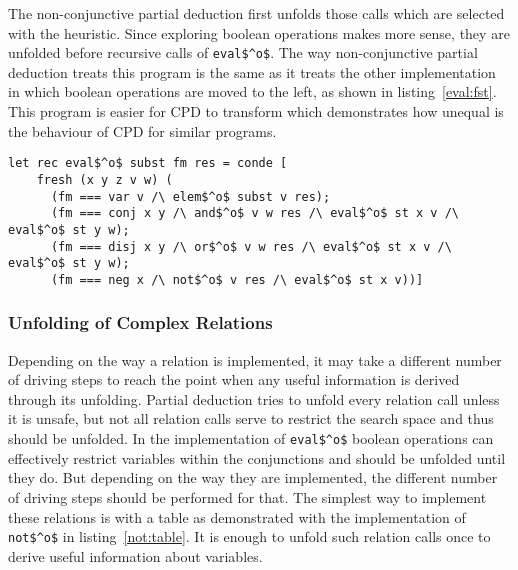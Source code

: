 The non-conjunctive partial deduction first unfolds those calls which are selected with the heuristic.
Since exploring boolean operations makes more sense, they are unfolded before recursive calls of \lstinline{eval$^o$}.
The way non-conjunctive partial deduction treats this program is the same as it treats the other implementation in which boolean operations are moved to the left, as shown in listing~\ref{eval:fst}.
This program is easier for CPD to transform which demonstrates how unequal is the behaviour of CPD for similar programs.

\begin{figure*}[!h]
  \centering
  \begin{minipage}{0.95\textwidth}
    \begin{lstlisting}[label={eval:fst}, caption={Evaluator of formulas with boolean operation second}, captionpos=b, frame=tb]
  let rec eval$^o$ subst fm res = conde [
    fresh (x y z v w) (
      (fm === var v /\ elem$^o$ subst v res);
      (fm === conj x y /\ and$^o$ v w res /\ eval$^o$ st x v /\ eval$^o$ st y w);
      (fm === disj x y /\ or$^o$ v w res /\ eval$^o$ st x v /\ eval$^o$ st y w);
      (fm === neg x /\ not$^o$ v res /\ eval$^o$ st x v))]
    \end{lstlisting}
  \end{minipage}
\end{figure*}

\subsubsection{Unfolding of Complex Relations}

Depending on the way a relation is implemented, it may take a different number of driving steps to reach the point when any useful information is derived through its unfolding.
Partial deduction tries to unfold every relation call unless it is unsafe, but not all relation calls serve to restrict the search space and thus should be unfolded.
In the implementation of \lstinline{eval$^o$} boolean operations can effectively restrict variables within the conjunctions and should be unfolded until they do.
But depending on the way they are implemented, the different number of driving steps should be performed for that.
The simplest way to implement these relations is with a table as demonstrated with the implementation of \lstinline{not$^o$} in listing~\ref{not:table}.
It is enough to unfold such relation calls once to derive useful information about variables.

